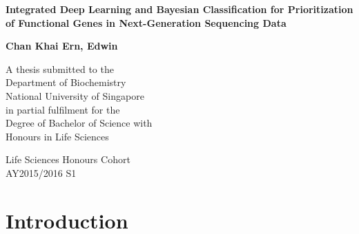 \documentclass{article}
\begin{document}
\begin{titlepage}


    \begin{center} 
	\Large
        \vspace*{1cm}
        
        \textbf{ Integrated Deep Learning and Bayesian Classification for Prioritization of Functional Genes in Next-Generation Sequencing Data }
        
        \vspace{0.5cm}
        
        \vspace{1.0cm}
        
        \textbf{Chan Khai Ern, Edwin}
        
\vspace{9.0cm}
        \normalsize
       A thesis submitted to the \\
Department of Biochemistry \\
National University of Singapore \\
in partial fulfilment for the \\
Degree of Bachelor of Science with \\Honours
in
Life Sciences\\

        
        \vspace{1.5cm}
        
        
        Life Sciences Honours Cohort \\
        AY2015/2016 S1\\
       
        
    \end{center}
\end{titlepage}


\doublespace
\normalsize
\section{Introduction}
\end{document}
